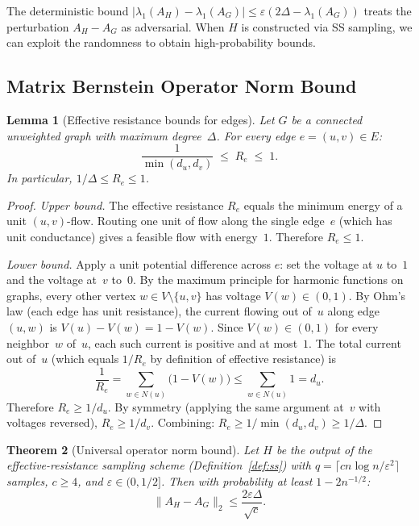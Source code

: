 \documentclass[11pt]{article}
\newtheorem{theorem}{Theorem}[section]
\newtheorem{lemma}[theorem]{Lemma}
\theoremstyle{definition}
\newcommand{\eps}{\varepsilon}
\newcommand{\lamH}{\lambda_1(A_H)}
\newcommand{\lamG}{\lambda_1(A_G)}
\newcommand{\AG}{A_G}
\newcommand{\AH}{A_H}
\begin{document}
The deterministic bound $|\lamH - \lamG| \leq \eps(2\Delta - \lamG)$ treats the
perturbation $\AH - \AG$ as adversarial. When $H$ is constructed via SS sampling,
we can exploit the randomness to obtain high-probability bounds.

\subsection{Matrix Bernstein Operator Norm Bound}

\begin{lemma}[Effective resistance bounds for edges]\label{lem:re-bounds}
Let $G$ be a connected unweighted graph with maximum degree~$\Delta$.
For every edge $e = (u,v) \in E$:
\[
\frac{1}{\min(d_u, d_v)} \;\leq\; R_e \;\leq\; 1.
\]
In particular, $1/\Delta \leq R_e \leq 1$.
\end{lemma}

\begin{proof}
\emph{Upper bound.}
The effective resistance $R_e$ equals the minimum energy of a unit $(u,v)$-flow.
Routing one unit of flow along the single edge~$e$ (which has unit conductance) gives
a feasible flow with energy~$1$. Therefore $R_e \leq 1$.

\emph{Lower bound.}
Apply a unit potential difference across $e$: set the voltage at $u$ to~$1$ and
the voltage at~$v$ to~$0$. By the maximum principle for harmonic functions on graphs,
every other vertex $w \in V \setminus \{u,v\}$ has voltage $V(w) \in (0,1)$.
By Ohm's law (each edge has unit resistance), the current flowing out of~$u$
along edge $(u,w)$ is $V(u) - V(w) = 1 - V(w)$. Since $V(w) \in (0,1)$ for every
neighbor~$w$ of~$u$, each such current is positive and at most~$1$. The total
current out of~$u$ (which equals $1/R_e$ by definition of effective resistance) is
\[
\frac{1}{R_e}
= \sum_{w \in N(u)} \bigl(1 - V(w)\bigr)
\leq \sum_{w \in N(u)} 1
= d_u.
\]
Therefore $R_e \geq 1/d_u$. By symmetry (applying the same argument at~$v$
with voltages reversed), $R_e \geq 1/d_v$. Combining:
$R_e \geq 1/\min(d_u, d_v) \geq 1/\Delta$.
\end{proof}

\begin{theorem}[Universal operator norm bound]\label{thm:bernstein}
Let $H$ be the output of the effective-resistance sampling scheme
(Definition~\ref{def:ss}) with
$q = \lceil cn\log n/\eps^2 \rceil$ samples, $c \geq 4$, and $\eps \in (0, 1/2]$.
Then with probability at least $1 - 2n^{-1/2}$:
\[
\|\AH - \AG\|_2 \leq \frac{2\eps\Delta}{\sqrt{c}}.
\]
\end{theorem}
\end{document}
